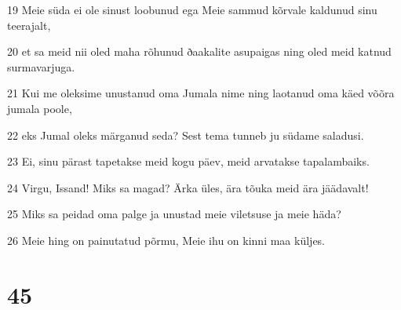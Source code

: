\par 19 Meie süda ei ole sinust loobunud ega Meie sammud kõrvale kaldunud sinu teerajalt,
\par 20 et sa meid nii oled maha rõhunud ðaakalite asupaigas ning oled meid katnud surmavarjuga.
\par 21 Kui me oleksime unustanud oma Jumala nime ning laotanud oma käed võõra jumala poole,
\par 22 eks Jumal oleks märganud seda? Sest tema tunneb ju südame saladusi.
\par 23 Ei, sinu pärast tapetakse meid kogu päev, meid arvatakse tapalambaiks.
\par 24 Virgu, Issand! Miks sa magad? Ärka üles, ära tõuka meid ära jäädavalt!
\par 25 Miks sa peidad oma palge ja unustad meie viletsuse ja meie häda?
\par 26 Meie hing on painutatud põrmu, Meie ihu on kinni maa küljes.

\chapter{45}

